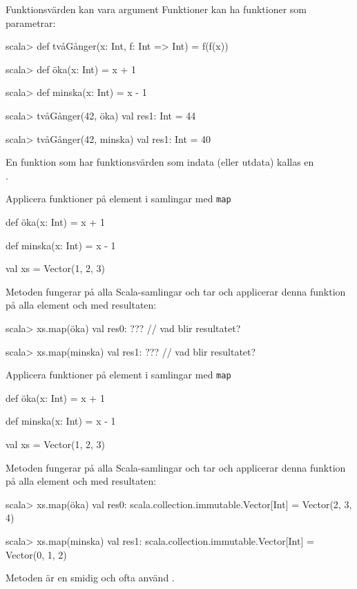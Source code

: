 \begin{Slide}{Funktionsvärden kan vara argument}\SlideFontSmall
Funktioner kan ha funktioner som parametrar:
\begin{REPL}
scala> def tvåGånger(x: Int, f: Int => Int) = f(f(x))

scala> def öka(x: Int) = x + 1

scala> def minska(x: Int) = x - 1

scala> tvåGånger(42, öka)
val res1: Int = 44

scala> tvåGånger(42, minska)
val res1: Int = 40
\end{REPL}
En funktion som har funktionsvärden som indata (eller utdata) kallas en\\   .

\end{Slide}



\begin{Slide}{Applicera funktioner på element i samlingar med \texttt{map}}\SlideFontSmall
\begin{Code}
def öka(x: Int) = x + 1

def minska(x: Int) = x - 1

val xs = Vector(1, 2, 3)
\end{Code}
\pause
Metoden  fungerar på alla Scala-samlingar och tar  och applicerar denna funktion på alla element och  med resultaten:
\begin{REPL}
scala> xs.map(öka)
val res0: ???   // vad blir resultatet?

scala> xs.map(minska)
val res1: ???   // vad blir resultatet?
\end{REPL}
\end{Slide}


\begin{Slide}{Applicera funktioner på element i samlingar med \texttt{map}}\SlideFontSmall
\begin{Code}
def öka(x: Int) = x + 1

def minska(x: Int) = x - 1

val xs = Vector(1, 2, 3)
\end{Code}
Metoden  fungerar på alla Scala-samlingar och tar  och applicerar denna funktion på alla element och  med resultaten:
\begin{REPL}
scala> xs.map(öka)
val res0: scala.collection.immutable.Vector[Int] = Vector(2, 3, 4)

scala> xs.map(minska)
val res1: scala.collection.immutable.Vector[Int] = Vector(0, 1, 2)
\end{REPL}
Metoden  är en smidig och ofta använd .
\end{Slide}

